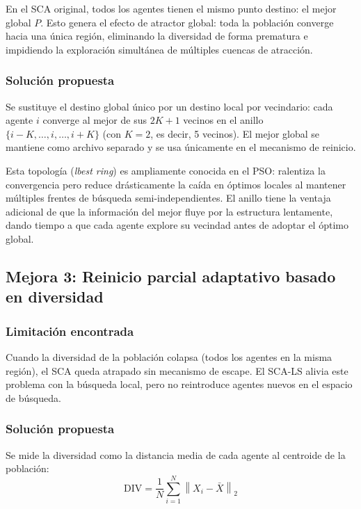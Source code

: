 \documentclass[12pt,a4paper]{article}
\begin{document}
En el SCA original, todos los agentes tienen el mismo punto destino: el mejor global $P$. Esto genera el efecto de atractor global: toda la población converge hacia una única región, eliminando la diversidad de forma prematura e impidiendo la exploración simultánea de múltiples cuencas de atracción.
 
\subsubsection{Solución propuesta}
 
Se sustituye el destino global único por un destino local por vecindario: cada agente $i$ converge al mejor de sus $2K+1$ vecinos en el anillo $\{i-K, \ldots, i, \ldots, i+K\}$ (con $K=2$, es decir, 5 vecinos). El mejor global se mantiene como archivo separado y se usa únicamente en el mecanismo de reinicio.
 
Esta topología (\textit{lbest ring}) es ampliamente conocida en el PSO: ralentiza la convergencia pero reduce drásticamente la caída en óptimos locales al mantener múltiples frentes de búsqueda semi-independientes. El anillo tiene la ventaja adicional de que la información del mejor fluye por la estructura lentamente, dando tiempo a que cada agente explore su vecindad antes de adoptar el óptimo global.
 
\subsection{Mejora 3: Reinicio parcial adaptativo basado en diversidad}
 
\subsubsection{Limitación encontrada}
 
Cuando la diversidad de la población colapsa (todos los agentes en la misma región), el SCA queda atrapado sin mecanismo de escape. El SCA-LS alivia este problema con la búsqueda local, pero no reintroduce agentes nuevos en el espacio de búsqueda.
 
\subsubsection{Solución propuesta}
 
Se mide la diversidad como la distancia media de cada agente al centroide de la población:
\begin{equation}
  \text{DIV} = \frac{1}{N} \sum_{i=1}^{N} \left\| {X}_i - \bar{{X}} \right\|_2
  \label{eq:div}
\end{equation}
 
\end{document}
